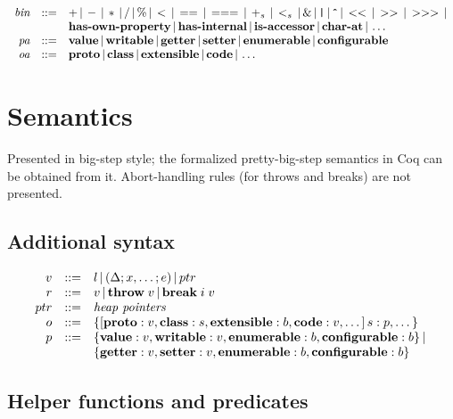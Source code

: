 \documentclass[draft, 10pt]{article}
\newcommand{\expr}[0]{e}
\newcommand{\var}[0]{x}
\newcommand{\lit}[0]{l}
\newcommand{\bool}[0]{b}
\newcommand{\str}[0]{s}
\newcommand{\id}[0]{i}
\newcommand{\binop}[0]{\textit{bin}}
\newcommand{\pattr}[0]{\textit{pa}}
\newcommand{\oattr}[0]{\textit{oa}}
\newcommand{\pavalue}[0]{\textbf{value}}
\newcommand{\pawritable}[0]{\textbf{writable}}
\newcommand{\paget}[0]{\textbf{getter}}
\newcommand{\paset}[0]{\textbf{setter}}
\newcommand{\paenum}[0]{\textbf{enumerable}}
\newcommand{\paconfig}[0]{\textbf{configurable}}
\newcommand{\oaproto}[0]{\textbf{proto}}
\newcommand{\oaclass}[0]{\textbf{class}}
\newcommand{\oaextens}[0]{\textbf{extensible}}
\newcommand{\oacode}[0]{\textbf{code}}
\newcommand{\brk}[2]{\textbf{break} \thickspace #1 \thickspace #2}
\newcommand{\throw}[1]{\textbf{throw} \thickspace #1}
\newcommand{\bnfsep}[0]{\thinspace | \thinspace}
\newcommand{\ophasprop}[0]{\textbf{has-own-property}}
\newcommand{\opisaccessor}[0]{\textbf{is-accessor}}
\newcommand{\opcharat}[0]{\textbf{char-at}}
\newcommand{\opband}[0]{\&}
\newcommand{\opbor}[0]{\texttt{|}}
\newcommand{\opbxor}[0]{\texttt{\^{}}}
\newcommand{\opshiftl}[0]{<<}
\newcommand{\opshiftr}[0]{>>}
\newcommand{\opzfshiftr}[0]{>>>}
\newcommand{\opadd}[0]{+}
\newcommand{\opsub}[0]{-}
\newcommand{\opmul}[0]{*}
\newcommand{\opdiv}[0]{/}
\newcommand{\opmod}[0]{\%}
\newcommand{\oplt}[0]{<}
\newcommand{\opstxeq}[0]{==}
\newcommand{\opsamevalue}[0]{===}
\newcommand{\ophasinternal}[0]{\textbf{has-internal}}
\newcommand{\opstrplus}[0]{+_{\str}}
\newcommand{\opstrlt}[0]{<_{\str}}
\newcommand{\varenv}[0]{\Delta}
\newcommand{\closure}[3]{(#1; #2; #3)}
\newcommand{\bigret}[0]{r}
\newcommand{\bigval}[0]{v}
\newcommand{\oprop}[0]{p}
\newcommand{\obj}[0]{o}
\newcommand{\objlit}[2]{\{[#1]\thinspace#2\}}
\newcommand{\bigthrow}[1]{\throw{#1}}
\newcommand{\bigbrk}[2]{\brk{#1}{#2}}
\newcommand{\heapptr}{ptr}
\begin{document}
\[\begin{array}{rcl}
\binop & ::= & \opadd \bnfsep \opsub \bnfsep \opmul \bnfsep \opdiv \bnfsep \opmod \bnfsep \oplt \bnfsep \opstxeq \bnfsep \opsamevalue \bnfsep \opstrplus \bnfsep \opstrlt \bnfsep \opband \bnfsep \opbor \bnfsep \opbxor \bnfsep \opshiftl \bnfsep \opshiftr \bnfsep \opzfshiftr \bnfsep \\
&& \ophasprop \bnfsep \ophasinternal \bnfsep \opisaccessor \bnfsep \opcharat \bnfsep \dots \\
\pattr & ::= & \pavalue \bnfsep \pawritable \bnfsep \paget \bnfsep \paset \bnfsep
               \paenum \bnfsep \paconfig \\
\oattr & ::= & \oaproto \bnfsep \oaclass \bnfsep \oaextens \bnfsep \oacode \bnfsep \dots
\end{array}
\]

\section{Semantics}

Presented in big-step style; the formalized pretty-big-step semantics in Coq can be obtained
from it. Abort-handling rules (for throws and breaks) are not presented.

\subsection{Additional syntax}

\[
\begin{array}{rcl}
\bigval & ::= & \lit \bnfsep \closure{\varenv}{\var, \dots}{\expr} \bnfsep \heapptr \\
\bigret & ::= & \bigval \bnfsep \bigthrow{\bigval} \bnfsep \bigbrk{\id}{\bigval} \\
\heapptr & ::= & \textit{heap pointers} \\
\obj & ::= & \objlit{\oaproto : \bigval, \oaclass : \str, \oaextens : \bool, \oacode : \bigval, \dots}{\str : \oprop, \dots} \\
\oprop & ::= & \{\pavalue : \bigval, \pawritable : \bigval, \paenum : \bool, \paconfig : \bool \} \bnfsep \\
           & & \{\paget : \bigval, \paset : \bigval, \paenum : \bool, \paconfig : \bool \} \\
\end{array}
\]

\subsection{Helper functions and predicates}
\end{document}
